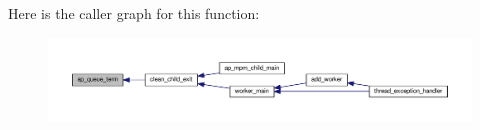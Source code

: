 Here is the caller graph for this function\+:
\nopagebreak
\begin{figure}[H]
\begin{center}
\leavevmode
\includegraphics[width=350pt]{group__APACHE__MPM__WORKER_gabd40aa9d9c5f2cd9a23d912200158c5f_icgraph}
\end{center}
\end{figure}


